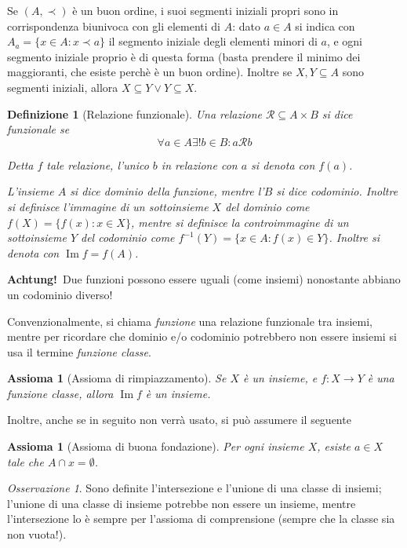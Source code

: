 \documentclass[a4paper,10pt,oneside]{article}
\DeclareMathOperator{\im}{Im}
\newcommand{\myname}[1]{\emph{#1}}
\newcommand{\rel}{\mathcal R}
\theoremstyle{plain}
\newtheorem{mydef}[mytheorem]{Definizione}
\newtheorem{myax}[mytheorem]{Assioma}
\theoremstyle{definition}
\theoremstyle{remark}
\newtheorem*{myobs}{Osservazione}
\begin{document}
Se $(A,\prec)$ è un buon ordine, i suoi segmenti iniziali propri sono in corrispondenza biunivoca con gli elementi di $A$: dato $a\in A$ si indica con $A_{a}=\{x\in A: x\prec a\}$ il segmento iniziale degli elementi minori di $a$, e ogni segmento iniziale proprio è di questa forma (basta prendere il minimo dei maggioranti, che esiste perchè è un buon ordine). Inoltre se $X,Y\subseteq A$ sono segmenti iniziali, allora $X\subseteq Y \vee Y\subseteq X$.

\begin{mydef}[Relazione funzionale]
 Una relazione $\rel \subseteq A\times B$ si dice funzionale se \[\forall a \in A \exists! b \in B: a\rel b\] 
 
 Detta $f$ tale relazione, l'unico $b$ in relazione con $a$ si denota con $f(a)$.
 
 L'insieme $A$ si dice \myname{dominio} della funzione, mentre l'$B$ si dice \myname{codominio}. Inoltre si definisce l'immagine di un sottoinsieme $X$ del dominio come $f(X)=\{f(x):x \in X\}$, mentre si definisce la controimmagine di un sottoinsieme $Y$ del codominio come $f^{-1}(Y)=\{x\in A: f(x)\in Y\}$. Inoltre si denota con $\im f = f(A)$.
\end{mydef}

\textbf{Achtung!}\texttrademark \ Due funzioni possono essere uguali (come insiemi) nonostante abbiano un codominio diverso!\vspace{6px}

Convenzionalmente, si chiama \myname{funzione} una relazione funzionale tra insiemi, mentre per ricordare che dominio e/o codominio potrebbero non essere insiemi si usa il termine \myname{funzione classe}.

\begin{myax}[Assioma di rimpiazzamento]
 Se $X$ è un insieme, e $f: X \rightarrow Y$ è una funzione classe, allora $\im f$ è un insieme.
\end{myax}

Inoltre, anche se in seguito non verrà usato, si può assumere il seguente
\begin{myax}[Assioma di buona fondazione]
 Per ogni insieme $X$, esiste $a \in X$ tale che $A \cap x = \emptyset$.
\end{myax}

\begin{myobs}
 Sono definite l'intersezione e l'unione di una classe di insiemi; l'unione di una classe di insieme potrebbe non essere un insieme, mentre l'intersezione lo è sempre per l'assioma di comprensione (sempre che la classe sia non vuota!).
\end{myobs}
\end{document}
